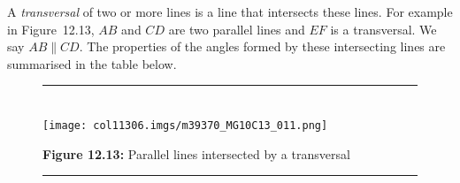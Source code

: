 	\par
        \label{m39370*id316273}A \textsl{transversal} of two or more lines is a line that intersects these lines. For example in Figure~12.13, $AB$ and $CD$ are two parallel lines and $EF$ is a transversal. We say $AB\parallel CD$. The properties of the angles formed by these intersecting lines are summarised in the table below.\par 
    \setcounter{subfigure}{0}
	\begin{figure}[H] %
    \begin{center}
    \rule[.1in]{\figurerulewidth}{.005in} \\
        \label{m39370*uid29!!!underscore!!!media}\label{m39370*uid29!!!underscore!!!printimage}\texttt{[image: col11306.imgs/m39370\_MG10C13\_011.png]} %
      \vspace{2pt}
    \vspace{\rubberspace}\par \begin{cnxcaption}
	  \small \textbf{Figure 12.13: }Parallel lines intersected by a transversal
	\end{cnxcaption}
    \vspace{.1in}
    \rule[.1in]{\figurerulewidth}{.005in} \\
    \end{center}
 \end{figure}       
